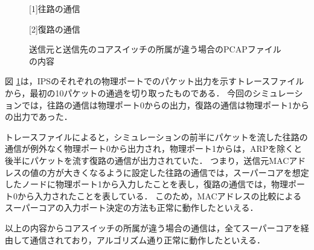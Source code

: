 \begin{figure}[tb]
	\begin{center}
		
		\begin{center}
			\hspace{1.6cm} [1]往路の通信
		\end{center}
		
		\begin{center}
			\hspace{1.6cm} [2]復路の通信
		\end{center}
		\caption{送信元と送信先のコアスイッチの所属が違う場合のPCAPファイルの内容}
		\label{fig:4-3}
	\end{center}
\end{figure}

図 \ref{fig:4-3}は，IPSのそれぞれの物理ポートでのパケット出力を示すトレースファイルから，最初の10パケットの通過を切り取ったものである．
今回のシミュレーションでは，往路の通信は物理ポート0からの出力，復路の通信は物理ポート1からの出力であった．

トレースファイルによると，シミュレーションの前半にパケットを流した往路の通信が例外なく物理ポート0から出力され，物理ポート1からは，ARPを除くと後半にパケットを流す復路の通信が出力されていた．
つまり，送信元MACアドレスの値の方が大きくなるように設定した往路の通信では，スーパーコアを想定したノードに物理ポート1から入力したことを表し，復路の通信では，物理ポート0から入力されたことを表している．
このため，MACアドレスの比較によるスーパーコアの入力ポート決定の方法も正常に動作したといえる．

以上の内容からコアスイッチの所属が違う場合の通信は，全てスーパーコアを経由して通信されており，アルゴリズム通り正常に動作したといえる．


